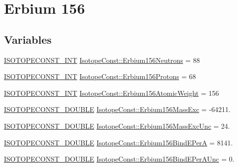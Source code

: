 \hypertarget{group___isotope_const-_erbium-_er156}{}\section{Erbium 156}
\label{group___isotope_const-_erbium-_er156}
\subsection*{Variables}
\begin{DoxyCompactItemize}
\item 
\mbox{\hyperlink{group___isotope_const-_macros_ga5f18360b3e99483a35c32d789e62621c}{I\+S\+O\+T\+O\+P\+E\+C\+O\+N\+S\+T\+\_\+\+I\+NT}} \mbox{\hyperlink{group___isotope_const-_erbium-_er156_gabe76bbcc12b1941df7e72c012f61c8a2}{Isotope\+Const\+::\+Erbium156\+Neutrons}} = 88
\item 
\mbox{\hyperlink{group___isotope_const-_macros_ga5f18360b3e99483a35c32d789e62621c}{I\+S\+O\+T\+O\+P\+E\+C\+O\+N\+S\+T\+\_\+\+I\+NT}} \mbox{\hyperlink{group___isotope_const-_erbium-_er156_ga94ef5383a1e9c975a37ecadfe323e41e}{Isotope\+Const\+::\+Erbium156\+Protons}} = 68
\item 
\mbox{\hyperlink{group___isotope_const-_macros_ga5f18360b3e99483a35c32d789e62621c}{I\+S\+O\+T\+O\+P\+E\+C\+O\+N\+S\+T\+\_\+\+I\+NT}} \mbox{\hyperlink{group___isotope_const-_erbium-_er156_gad259b09c265b657d4b9ae513dbf3f300}{Isotope\+Const\+::\+Erbium156\+Atomic\+Weight}} = 156
\item 
\mbox{\hyperlink{group___isotope_const-_macros_ga8f45a7272ce02c0b4c65c44636ed719a}{I\+S\+O\+T\+O\+P\+E\+C\+O\+N\+S\+T\+\_\+\+D\+O\+U\+B\+LE}} \mbox{\hyperlink{group___isotope_const-_erbium-_er156_ga3e699a39d5237de983d68df562ef56be}{Isotope\+Const\+::\+Erbium156\+Mass\+Exc}} = -\/64211.
\item 
\mbox{\hyperlink{group___isotope_const-_macros_ga8f45a7272ce02c0b4c65c44636ed719a}{I\+S\+O\+T\+O\+P\+E\+C\+O\+N\+S\+T\+\_\+\+D\+O\+U\+B\+LE}} \mbox{\hyperlink{group___isotope_const-_erbium-_er156_ga81ee69aa1dd473ea63046e640407612f}{Isotope\+Const\+::\+Erbium156\+Mass\+Exc\+Unc}} = 24.
\item 
\mbox{\hyperlink{group___isotope_const-_macros_ga8f45a7272ce02c0b4c65c44636ed719a}{I\+S\+O\+T\+O\+P\+E\+C\+O\+N\+S\+T\+\_\+\+D\+O\+U\+B\+LE}} \mbox{\hyperlink{group___isotope_const-_erbium-_er156_ga6ff15e9a1a77ccd6cf4bf28be44c9af3}{Isotope\+Const\+::\+Erbium156\+Bind\+E\+PerA}} = 8141.
\item 
\mbox{\hyperlink{group___isotope_const-_macros_ga8f45a7272ce02c0b4c65c44636ed719a}{I\+S\+O\+T\+O\+P\+E\+C\+O\+N\+S\+T\+\_\+\+D\+O\+U\+B\+LE}} \mbox{\hyperlink{group___isotope_const-_erbium-_er156_ga8a97a5364e79be11627b2a83eebdf378}{Isotope\+Const\+::\+Erbium156\+Bind\+E\+Per\+A\+Unc}} = 0.

\end{DoxyCompactItemize}

